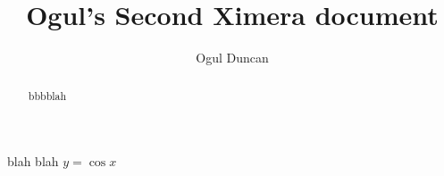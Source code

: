 \documentclass{ximera}
\title{Ogul's Second Ximera document}
\author{Ogul Duncan}
\begin{document}
\begin{abstract}
    bbbblah
\end{abstract}


\maketitle
blah blah $y=\cos x$
\end{document}
